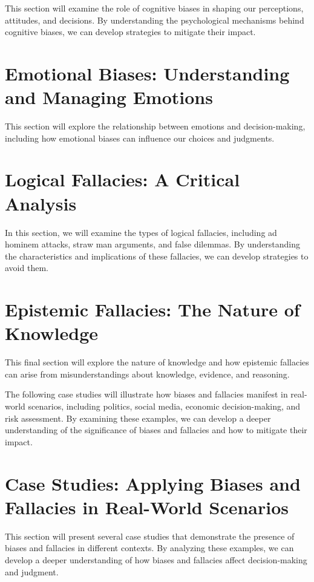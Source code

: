 This section will examine the role of cognitive biases in shaping our perceptions, attitudes, and decisions. By understanding the psychological mechanisms behind cognitive biases, we can develop strategies to mitigate their impact.

\section{Emotional Biases: Understanding and Managing Emotions}

This section will explore the relationship between emotions and decision-making, including how emotional biases can influence our choices and judgments.

\section{Logical Fallacies: A Critical Analysis}

In this section, we will examine the types of logical fallacies, including ad hominem attacks, straw man arguments, and false dilemmas. By understanding the characteristics and implications of these fallacies, we can develop strategies to avoid them.

\section{Epistemic Fallacies: The Nature of Knowledge}

This final section will explore the nature of knowledge and how epistemic fallacies can arise from misunderstandings about knowledge, evidence, and reasoning.

The following case studies will illustrate how biases and fallacies manifest in real-world scenarios, including politics, social media, economic decision-making, and risk assessment. By examining these examples, we can develop a deeper understanding of the significance of biases and fallacies and how to mitigate their impact.

\section{Case Studies: Applying Biases and Fallacies in Real-World Scenarios}

This section will present several case studies that demonstrate the presence of biases and fallacies in different contexts. By analyzing these examples, we can develop a deeper understanding of how biases and fallacies affect decision-making and judgment.

